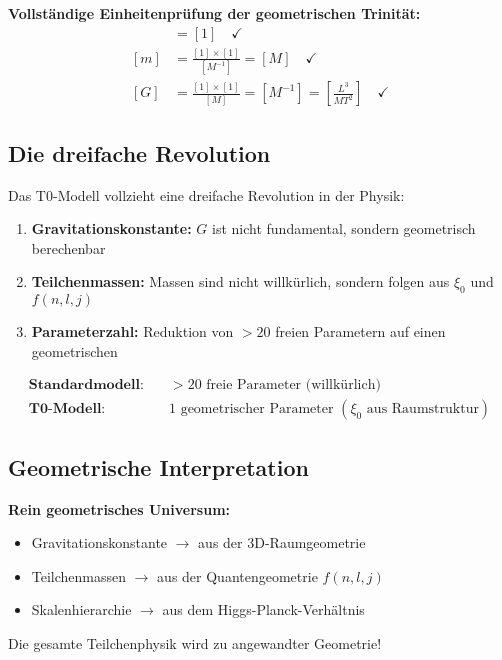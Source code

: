 \documentclass[12pt,a4paper]{article}
\theoremstyle{definition}
\begin{document}
	\textbf{Vollständige Einheitenprüfung der geometrischen Trinität:}
	\begin{align}
		[\xi_0] &= [1] \quad \checkmark \\
		[m] &= \frac{[1] \times [1]}{[M^{-1}]} = [M] \quad \checkmark \\
		[G] &= \frac{[1] \times [1]}{[M]} = [M^{-1}] = \left[\frac{L^3}{MT^2}\right] \quad \checkmark
	\end{align}
	
	\subsection{Die dreifache Revolution}
	
	Das T0-Modell vollzieht eine dreifache Revolution in der Physik:
	
	\begin{enumerate}
		\item \textbf{Gravitationskonstante:} $G$ ist nicht fundamental, sondern geometrisch berechenbar
		\item \textbf{Teilchenmassen:} Massen sind nicht willkürlich, sondern folgen aus $\xi_0$ und $f(n,l,j)$
		\item \textbf{Parameterzahl:} Reduktion von $>20$ freien Parametern auf einen geometrischen
	\end{enumerate}
	
	\begin{align}
		\textbf{Standardmodell:} \quad &>20 \text{ freie Parameter (willkürlich)}\\
		\textbf{T0-Modell:} \quad &1 \text{ geometrischer Parameter } (\xi_0 \text{ aus Raumstruktur})
	\end{align}
	
	\subsection{Geometrische Interpretation}
	
	\begin{tcolorbox}[colback=orange!5!white,colframe=orange!75!black,title=Einsteins Vision erfüllt]
		\textbf{Rein geometrisches Universum:}
		\begin{itemize}
			\item Gravitationskonstante $\rightarrow$ aus der 3D-Raumgeometrie
			\item Teilchenmassen $\rightarrow$ aus der Quantengeometrie $f(n,l,j)$
			\item Skalenhierarchie $\rightarrow$ aus dem Higgs-Planck-Verhältnis
		\end{itemize}
		
		Die gesamte Teilchenphysik wird zu angewandter Geometrie!
	\end{tcolorbox}
	
\end{document}

